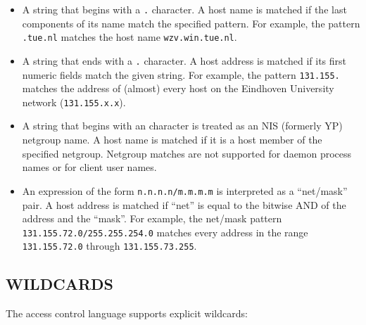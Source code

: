 \documentclass[11pt,twoside,onecolumn]{book}
\begin{document}
\begin{itemize}

\item A string that begins with a {\tt .} character. A host name is matched if
the last components of its name match the specified pattern.  For
example, the pattern {\tt .tue.nl} matches the host name
{\tt wzv.win.tue.nl}.

\item A string that ends with a {\tt .} character. A host address is matched if
its first numeric fields match the given string.  For example, the
pattern {\tt 131.155.} matches the address of (almost) every host on the
Eindhoven University network ({\tt 131.155.x.x}).

\item A string that begins with an {\tt \@} character is treated as an NIS
(formerly YP) netgroup name. A host name is matched if it is a host
member of the specified netgroup. Netgroup matches are not supported
for daemon process names or for client user names.

\item An expression of the form {\tt n.n.n.n/m.m.m.m} is interpreted as a
``net/mask'' pair. A host address is matched if ``net'' is equal to the
bitwise AND of the address and the ``mask''. For example, the net/mask
pattern {\tt 131.155.72.0/255.255.254.0} matches every address in the
range {\tt 131.155.72.0} through {\tt 131.155.73.255}.

\end{itemize}

\subsection*{WILDCARDS}

The access control language supports explicit wildcards:
\end{document}

